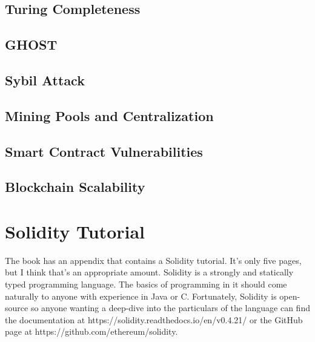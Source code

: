 \documentclass{article}
\begin{document}
\subsection{Turing Completeness}

\subsection{GHOST}

\subsection{Sybil Attack}

\subsection{Mining Pools and Centralization}

\subsection{Smart Contract Vulnerabilities}

\subsection{Blockchain Scalability}

\section{Solidity Tutorial}
The book has an appendix that contains a Solidity tutorial. It's only five pages, but I think that's an appropriate amount. Solidity is a strongly and statically typed programming language. The basics of programming in it should come naturally to anyone with experience in Java or C. Fortunately, Solidity is open-source so
anyone wanting a deep-dive into the particulars of the language can find the documentation at https://solidity.readthedocs.io/en/v0.4.21/ or the GitHub page at https://github.com/ethereum/solidity.
\end{document}
